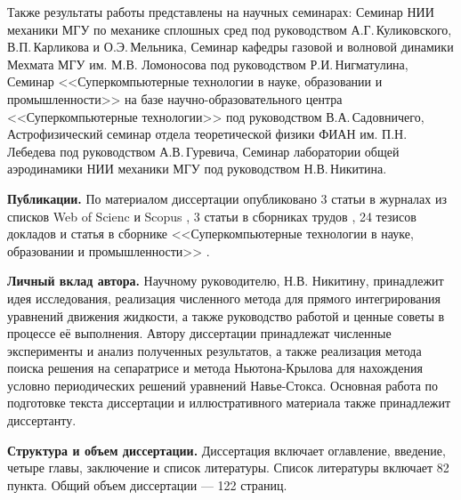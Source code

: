 Также результаты работы представлены на научных семинарах: 
Семинар НИИ механики МГУ по механике сплошных сред под руководством А.Г.\,Куликовского, В.П.\,Карликова и О.Э.\,Мельника, 
Семинар кафедры газовой и волновой динамики Мехмата МГУ им. М.В. Ломоносова под руководством Р.И.\,Нигматулина,
Семинар <<Суперкомпьютерные технологии в науке, образовании и промышленности>> на базе научно-образовательного центра <<Суперкомпьютерные технологии>> под руководством В.А.\,Садовничего,
Астрофизический семинар отдела теоретической физики ФИАН им. П.Н.\,Лебедева под руководством А.В.\,Гуревича,
Семинар лаборатории общей аэродинамики НИИ механики МГУ под руководством Н.В.\,Никитина.

\textbf{Публикации.} 
По материалом диссертации опубликовано 3 статьи в журналах из списков Web of Scienc и Scopus \cite{MZG2015, MZG2017, Vest18}, 
3 статьи в сборниках трудов \cite{KMU2015, KMU2016, KMU17}, 
24 тезисов докладов 
и статья в сборнике <<Суперкомпьютерные технологии в науке, образовании и промышленности>> \cite{Almanac2017}.

{\bf Личный вклад автора.} 
Научному руководителю, Н.В. Никитину, принадлежит идея исследования, реализация численного метода для прямого интегрирования уравнений движения жидкости, а также руководство работой и ценные советы в процессе её выполнения. Автору диссертации принадлежат численные эксперименты и анализ полученных результатов, а также реализация метода поиска решения на сепаратрисе и метода Ньютона-Крылова для нахождения условно периодических решений уравнений Навье-Стокса. Основная работа по подготовке текста диссертации и иллюстративного материала также принадлежит диссертанту. 

{\bf Структура и объем диссертации.} 
Диссертация включает оглавление, введение, четыре главы, заключение и список литературы. Список литературы включает 82 пункта. Общий объем диссертации --- 122 страниц. 




